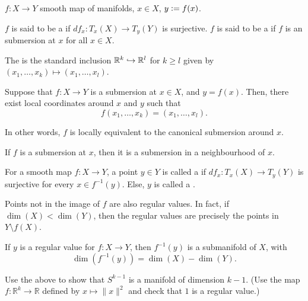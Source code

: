 \documentclass[12pt]{article}
\begin{document}
\begin{defn} 
	$f : X \to Y$ smooth map of manifolds, $x \in X$, $y \vcentcolon= f(x)$.

	$f$ is said to be a  if $df_{x} : T_{x}(X) \to T_{y}(Y)$ is surjective. \newline
	$f$ is said to be a  if $f$ is an submersion at $x$ for all $x \in X$. 

	The  is the standard inclusion $\mathbb{R}^{k} \hookrightarrow \mathbb{R}^{l}$ for $k \ge l$ given by $(x_{1}, \ldots, x_{k}) \mapsto (x_{1}, \ldots, x_{l})$.
\end{defn}

\begin{thm}
	Suppose that $f : X \to Y$ is a submersion at $x \in X$, and $y = f(x)$. Then, there exist local coordinates around $x$ and $y$ such that
	\begin{equation*} 
		f(x_{1}, \ldots, x_{k}) = (x_{1}, \ldots, x_{l}).
	\end{equation*}

	In other words, $f$ is locally equivalent to the canonical submersion around $x$.
\end{thm}

\begin{cor}
	If $f$ is a submersion at $x$, then it is a submersion in a neighbourhood of $x$.
\end{cor}

\begin{defn}
	For a smooth map $f : X \to Y$, a point $y \in Y$ is called a  if $df_{x} : T_{x}(X) \to T_{y}(Y)$ is surjective for every $x \in f^{-1}(y)$. Else, $y$ is called a .
\end{defn}
Points not in the image of $f$ are also regular values. In fact, if $\dim(X) < \dim(Y)$, then the regular values are precisely the points in $Y \setminus f(X)$.

\begin{thm}
	If $y$ is a regular value for $f : X \to Y$, then $f^{-1}(y)$ is a submanifold of $X$, with
	\begin{equation*} 
		\boxed{\dim(f^{-1}(y)) = \dim(X) - \dim(Y).}
	\end{equation*}
\end{thm}

\begin{exe}
	Use the above to show that $S^{k - 1}$ is a manifold of dimension $k - 1$. (Use the map $f : \mathbb{R}^{k} \to \mathbb{R}$ defined by $x \mapsto \|x\|^{2}$ and check that $1$ is a regular value.)
\end{exe}
\end{document}
